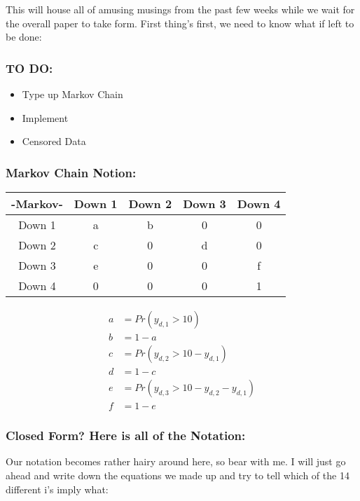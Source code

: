 \documentclass[aoas]{imsart}\usepackage[]{graphicx}\usepackage[]{color}
\begin{document}
This will house all of amusing musings from the past few weeks while we wait for the overall paper to take form. First thing's first, we need to know what if left to be done:

\subsubsection{TO DO:}
\begin{itemize}
	\item Type up Markov Chain
	\item Implement %
	\item Censored Data
\end{itemize}

\subsubsection{Markov Chain Notion: }
\begin{center}
	\begin{tabular}{|c |c c c c|} 
		\hline
		-Markov- & Down 1 & Down 2 & Down 3 & Down 4 \\ \hline
		Down 1 & a & b & 0 & 0 \\ 
		\hline
		Down 2 & c & 0 & d & 0 \\
		\hline
		Down 3 & e & 0 & 0 & f\\
		\hline
		Down 4 & 0 & 0 & 0 & 1 \\
		\hline
	\end{tabular}
	\begin{align*}
	a &= Pr(y_{d,1} > 10)\\
	b &= 1-a\\
	c &= Pr(y_{d,2} > 10 - y_{d,1})\\
	d &= 1 - c\\
	e &= Pr(y_{d,3} > 10 - y_{d,2} - y_{d,1})\\
	f &= 1 - e
	\end{align*}
\end{center}

\subsubsection{Closed Form? Here is all of the Notation:}
Our notation becomes rather hairy around here, so bear with me. I will just go ahead and write down the equations we made up and try to tell which of the 14 different i's imply what: 
\end{document}
